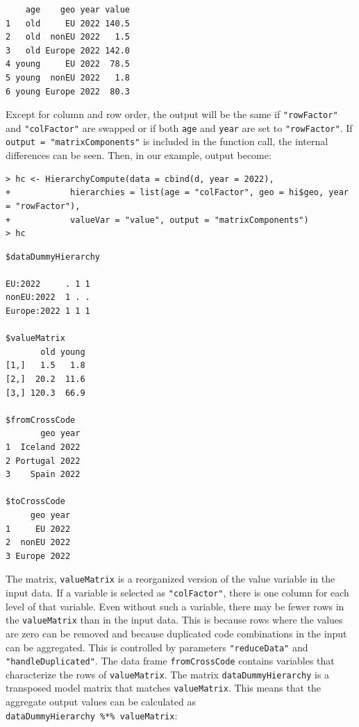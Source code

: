 \begin{verbatim}
    age    geo year value
1   old     EU 2022 140.5
2   old  nonEU 2022   1.5
3   old Europe 2022 142.0
4 young     EU 2022  78.5
5 young  nonEU 2022   1.8
6 young Europe 2022  80.3
\end{verbatim}

Except for column and row order, the output will be the same if \texttt{"rowFactor"} and \texttt{"colFactor"} are swapped or if both \texttt{age} and \texttt{year} are set to \texttt{"rowFactor"}.
If \texttt{output\ =\ "matrixComponents"} is included in the function call, the internal differences can be seen. Then, in our example, output become:

\begin{verbatim}
> hc <- HierarchyCompute(data = cbind(d, year = 2022), 
+            hierarchies = list(age = "colFactor", geo = hi$geo, year = "rowFactor"), 
+            valueVar = "value", output = "matrixComponents")
> hc
\end{verbatim}

\begin{verbatim}
$dataDummyHierarchy
                 
EU:2022     . 1 1
nonEU:2022  1 . .
Europe:2022 1 1 1

$valueMatrix
       old young
[1,]   1.5   1.8
[2,]  20.2  11.6
[3,] 120.3  66.9

$fromCrossCode
       geo year
1  Iceland 2022
2 Portugal 2022
3    Spain 2022

$toCrossCode
     geo year
1     EU 2022
2  nonEU 2022
3 Europe 2022
\end{verbatim}

The matrix, \texttt{valueMatrix} is a reorganized version of the value variable in the input data.
If a variable is selected as \texttt{"colFactor"}, there is one column for each level of that variable.
Even without such a variable, there may be fewer rows in the \texttt{valueMatrix} than in the input data.
This is because rows where the values are zero can be removed and because duplicated code combinations in the input can be aggregated.
This is controlled by parameters \texttt{"reduceData"} and \texttt{"handleDuplicated"}.
The data frame \texttt{fromCrossCode} contains variables that characterize the rows of \texttt{valueMatrix}.
The matrix \texttt{dataDummyHierarchy} is a transposed model matrix that matches \texttt{valueMatrix}.
This means that the aggregate output values can be calculated as \texttt{dataDummyHierarchy\ \%*\%\ valueMatrix}:

